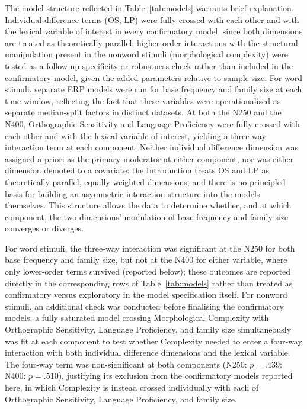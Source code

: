 \documentclass[utf8]{FrontiersinHarvard} %
\begin{document}
	The model structure reflected in Table~\ref{tab:models} warrants brief explanation. Individual difference terms (OS, LP) were fully crossed with each other and with the lexical variable of interest in every confirmatory model, since both dimensions are treated as theoretically parallel; higher-order interactions with the structural manipulation present in the nonword stimuli (morphological complexity) were tested as a follow-up specificity or robustness check rather than included in the confirmatory model, given the added parameters relative to sample size. For word stimuli, separate ERP models were run for base frequency and family size at each time window, reflecting the fact that these variables were operationalised as separate median-split factors in distinct datasets. At both the N250 and the N400, Orthographic Sensitivity and Language Proficiency were fully crossed with each other and with the lexical variable of interest, yielding a three-way interaction term at each component. Neither individual difference dimension was assigned a priori as the primary moderator at either component, nor was either dimension demoted to a covariate: the Introduction treats OS and LP as theoretically parallel, equally weighted dimensions, and there is no principled basis for building an asymmetric interaction structure into the models themselves. This structure allows the data to determine whether, and at which component, the two dimensions' modulation of base frequency and family size converges or diverges.

	For word stimuli, the three-way interaction was significant at the N250 for both base frequency and family size, but not at the N400 for either variable, where only lower-order terms survived (reported below); these outcomes are reported directly in the corresponding rows of Table~\ref{tab:models} rather than treated as confirmatory versus exploratory in the model specification itself. For nonword stimuli, an additional check was conducted before finalising the confirmatory models: a fully saturated model crossing Morphological Complexity with Orthographic Sensitivity, Language Proficiency, and family size simultaneously was fit at each component to test whether Complexity needed to enter a four-way interaction with both individual difference dimensions and the lexical variable. The four-way term was non-significant at both components (N250: $p = .439$; N400: $p = .510$), justifying its exclusion from the confirmatory models reported here, in which Complexity is instead crossed individually with each of Orthographic Sensitivity, Language Proficiency, and family size.
\end{document}
